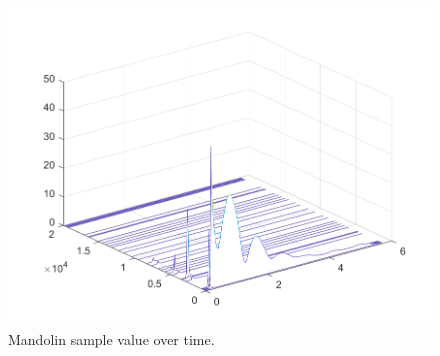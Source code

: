 \documentclass{article}
\begin{document}
            \begin{figure}[H]
                \includegraphics[scale=0.5]{images/specWaterfallMando2.png}%
                \centering
                \caption{Mandolin sample value over time.}
                \label{specWaterfallMando2}
            \end{figure}
\end{document}
